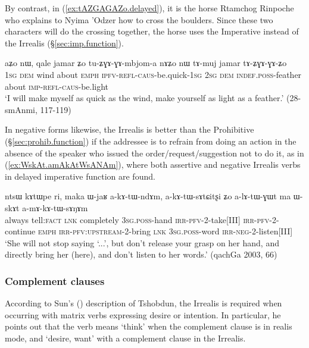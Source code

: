 By contrast, in (\ref{ex:tAZGAGAZo.delayed}), it is the horse Rtamchog Rinpoche who explains to Nyima 'Odzer how to cross the boulders. Since these two characters will do the crossing together, the horse uses the Imperative  instead of the Irrealis (§\ref{sec:imp.function}).

\begin{exe}
\ex \label{ex:tAZGAGAZo.delayed}
\gll aʑo nɯ, qale jamar ʑo tu-ʑɣɤ-ɣɤ-mbjom-a nɤʑo nɯ tɤ-muj jamar tɤ-ʑɣɤ-ɣɤ-ʑo \\
\textsc{1sg} \textsc{dem} wind about \textsc{emph} \textsc{ipfv}-\textsc{refl}-\textsc{caus}-be.quick-\textsc{1sg} \textsc{2sg} \textsc{dem} \textsc{indef}.\textsc{poss}-feather about \textsc{imp}-\textsc{refl}-\textsc{caus}-be.light \\
\glt `I will make myself as quick as the wind, make yourself as light as a feather.' (28-smAnmi, 117-119)
\end{exe}

In negative forms likewise, the Irrealis is better than the Prohibitive (§\ref{sec:prohib.function}) if the addressee is to refrain from doing an action in the absence of the speaker who issued the order/request/suggestion not to do it, as in (\ref{ex:WskAt.amAkAtWsANAm}), where both assertive and negative Irrealis verbs in delayed imperative function are found.


\begin{exe}
\ex \label{ex:WskAt.amAkAtWsANAm}
\gll  [...] ntsɯ kɤtɯpe ri, maka ɯ-jaʁ a-kɤ-tɯ-ndɤm, a-kɤ-tɯ-sɤtɕitʂi ʑo a-lɤ-tɯ-ɣɯt ma ɯ-skɤt a-mɤ-kɤ-tɯ-sɤŋɤm \\
{ } always tell:\textsc{fact} \textsc{lnk} completely \textsc{3sg}.\textsc{poss}-hand \textsc{irr}-\textsc{pfv}-2-take[III] \textsc{irr}-\textsc{pfv}-2-continue \textsc{emph} \textsc{irr}-\textsc{pfv}:\textsc{upstream}-2-bring \textsc{lnk} \textsc{3sg}.\textsc{poss}-word \textsc{irr}-\textsc{neg}-2-listen[III] \\
\glt `She will not stop saying `...', but don't release your grasp on her hand, and directly bring her (here), and don't listen to her words.' (qachGa 2003, 66)
\end{exe}

\subsubsection{Complement clauses} \label{sec:irrealis.complement.clauses}
According to Sun's (\citeyear[807]{jackson07irrealis}) description of Tshobdun, the Irrealis is required when occurring with matrix verbs expressing desire or intention. In particular, he points out that the verb  means `think' when the complement clause is in realis mode, and `desire, want' with a complement clause in the Irrealis.

